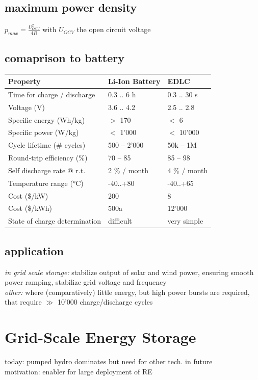 \documentclass[a4paper,10pt,landscape]{scrartcl}
\begin{document}
\begin{multicols*}{3}
\subsection{maximum power density}
$p_{max}=\frac{U_{OCV}^2}{4R}$ with $U_{OCV}$ the open circuit voltage
\subsection{comaprison to battery}
\begin{tabular}{|p{4cm}|p{2cm}|p{2cm}|}
\hline
\textbf{Property} & \textbf{Li-Ion Battery} & \textbf{EDLC} \\ \hline
Time for charge / discharge & 0.3 .. 6 h & 0.3 .. 30 s \\ \hline
Voltage (V) & 3.6 .. 4.2 & 2.5 .. 2.8 \\ \hline
Specific energy (Wh/kg) & $>$ 170 & $<$ 6 \\ \hline
Specific power (W/kg) & $<$ 1'000 & $<$ 10'000 \\ \hline
Cycle lifetime (\# cycles) & 500 – 2'000 & 50k – 1M \\ \hline
Round-trip efficiency (\%) & 70 – 85 & 85 – 98 \\ \hline
Self discharge rate @ r.t. & 2 \% / month & 4 \% / month \\ \hline
Temperature range (°C) & -40..+80 & -40..+65 \\ \hline
Cost (\$/kW) & 200 & 8 \\ \hline
Cost (\$/kWh) & 500a & 12'000 \\ \hline
State of charge determination & difficult & very simple \\ \hline
\end{tabular}

\subsection{application}
\textit{in grid scale storage:} stabilize output of solar and wind power, ensuring smooth power ramping, stabilize grid voltage and frequency \\
\textit{other:} where (comparatively) little energy,
but high power bursts are required, that require $\gg$ 10'000 charge/discharge cycles

\section{Grid-Scale Energy Storage}
today: pumped hydro dominates but need for other tech. in future \\
motivation: enabler for large deployment of RE


\end{multicols*}
\end{document}
